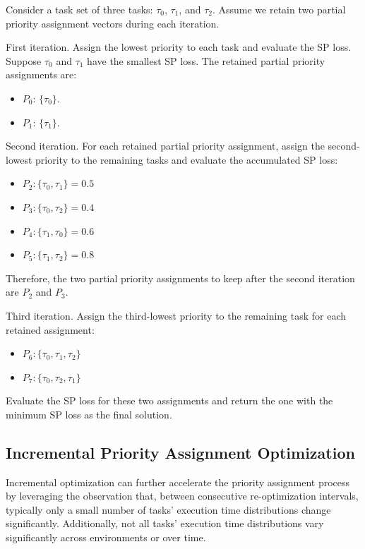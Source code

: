 	\begin{Example}
        Consider a task set of three tasks: $\tau_0$, $\tau_1$, and $\tau_2$.
        Assume we retain two partial priority assignment vectors during each iteration.

        First iteration.
        Assign the lowest priority to each task and evaluate the SP loss.
        Suppose $\tau_0$ and $\tau_1$ have the smallest SP loss.
        The retained partial priority assignments are:
        \begin{itemize}
        \item $P_0$: $\{\tau_0 \}$.
        \item $P_1$: $\{\tau_1 \}$.
        \end{itemize}

        Second iteration.
        For each retained partial priority assignment, assign the second-lowest priority to the remaining tasks and evaluate the accumulated SP loss:
        \begin{itemize}
            \item $P_2: \{\tau_0, \tau_1\} = 0.5$
            \item $P_3: \{\tau_0, \tau_2\} = 0.4$
            \item $P_4: \{\tau_1, \tau_0\} = 0.6$
            \item $P_5: \{\tau_1, \tau_2\} = 0.8$
        \end{itemize}
        Therefore, the two partial priority assignments to keep after the second iteration are $P_2$ and $P_3$.

        Third iteration.
        Assign the third-lowest priority to the remaining task for each retained assignment:
        \begin{itemize}
            \item $P_6:  \{\tau_0, \tau_1, \tau_2\}$
            \item $P_7:  \{\tau_0, \tau_2, \tau_1\}$
        \end{itemize}
        Evaluate the SP loss for these two assignments and return the one with the minimum SP loss as the final solution.
	\end{Example}


	\subsection{Incremental Priority Assignment Optimization}
	\label{section_increment_pa}

    Incremental optimization can further accelerate the priority assignment process by leveraging the observation that, between consecutive re-optimization intervals, typically only a small number of tasks' execution time distributions change significantly.
    Additionally, not all tasks' execution time distributions vary significantly across environments or over time.

